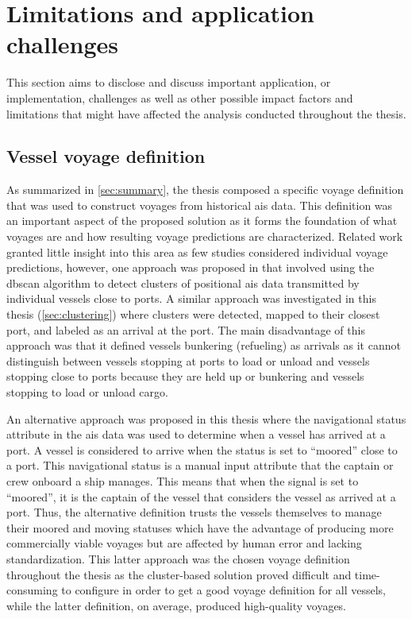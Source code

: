 \section{Limitations and application challenges}

This section aims to disclose and discuss important application, or implementation, challenges as well as other possible impact factors and limitations that might have affected the analysis conducted throughout the thesis.

\subsection{Vessel voyage definition}

As summarized in \cref{sec:summary}, the thesis composed a specific voyage definition that was used to construct voyages from historical \acrshort{ais} data. This definition was an important aspect of the proposed solution as it forms the foundation of what voyages are and how resulting voyage predictions are characterized. Related work granted little insight into this area as few studies considered individual voyage predictions, however, one approach was proposed in \cite{Zhang2020AISApproach} that involved using the \acrshort{dbscan} algorithm to detect clusters of positional \acrshort{ais} data transmitted by individual vessels close to ports. A similar approach was investigated in this thesis (\cref{sec:clustering}) where clusters were detected, mapped to their closest port, and labeled as an arrival at the port. The main disadvantage of this approach was that it defined vessels bunkering (refueling) as arrivals as it cannot distinguish between vessels stopping at ports to load or unload and vessels stopping close to ports because they are held up or bunkering and vessels stopping to load or unload cargo.

An alternative approach was proposed in this thesis where the navigational status attribute in the \acrshort{ais} data was used to determine when a vessel has arrived at a port. A vessel is considered to arrive when the status is set to ``moored'' close to a port. This navigational status is a manual input attribute that the captain or crew onboard a ship manages. This means that when the signal is set to ``moored'', it is the captain of the vessel that considers the vessel as arrived at a port. Thus, the alternative definition trusts the vessels themselves to manage their moored and moving statuses which have the advantage of producing more commercially viable voyages but are affected by human error and lacking standardization. This latter approach was the chosen voyage definition throughout the thesis as the cluster-based solution proved difficult and time-consuming to configure in order to get a good voyage definition for all vessels, while the latter definition, on average, produced high-quality voyages.

